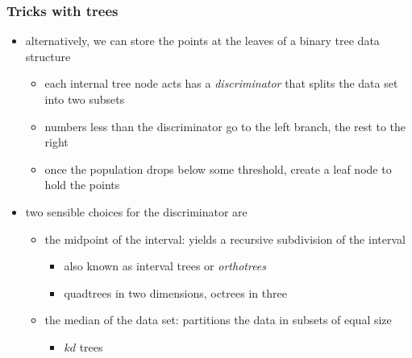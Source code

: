\begin{frame}[fragile]
%
  \frametitle{Tricks with trees}
%
  \begin{itemize}
%
  \item alternatively, we can store the points at the leaves of a binary tree data structure
    \begin{itemize}
    \item each internal tree node acts has a {\em discriminator} that splits the data set into
      two subsets
    \item numbers less than the discriminator go to the left branch, the rest to the right
    \item once the population drops below some threshold, create a leaf node to hold the points
    \end{itemize}
%
%
  \item two sensible choices for the discriminator are
    \begin{itemize}
    \item the midpoint of the interval: yields a recursive subdivision of the interval
      \begin{itemize}
      \item also known as interval trees or {\em orthotrees}
      \item quadtrees in two dimensions, octrees in three
      \end{itemize}
    \item the median of the data set: partitions the data in subsets of equal size
      \begin{itemize}
      \item $kd$ trees
      \end{itemize}
    \end{itemize}
%
  \end{itemize}
%
\end{frame}

